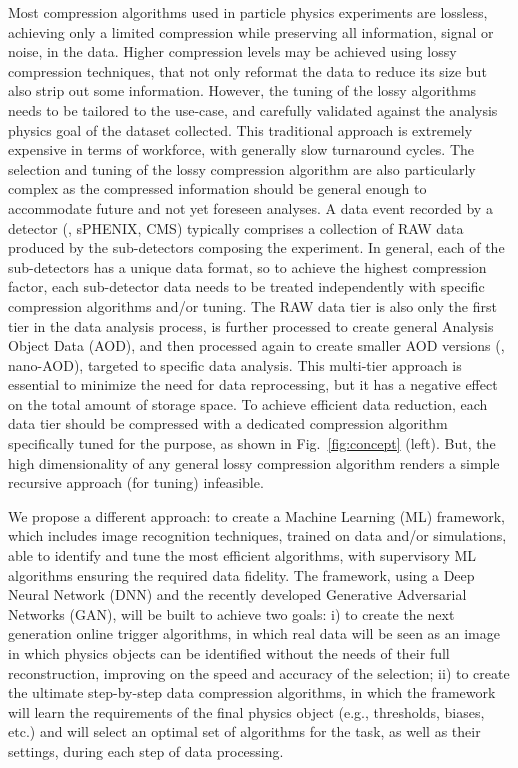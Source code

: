  Most compression algorithms used in particle physics experiments are lossless, achieving only a limited compression while preserving all information, signal or noise, in the data.  Higher compression levels may be achieved using lossy compression techniques, that not only reformat the data to reduce its size but also strip out some information. However, the tuning of the lossy algorithms needs to be tailored to the use-case, and carefully validated against the analysis physics goal of the dataset collected. This traditional approach is extremely expensive in terms of workforce, with generally slow turnaround cycles. The selection and tuning of the lossy compression algorithm are also particularly complex as the compressed information should be general enough to accommodate future and not yet foreseen analyses. A data event recorded by a detector (\eg, sPHENIX, CMS) typically comprises a collection of RAW data produced by the sub-detectors composing the experiment. In general, each of the sub-detectors has a unique data format, so to achieve the highest compression factor, each sub-detector data needs to be treated independently with specific compression algorithms and/or tuning. The RAW data tier is also only the first tier in the data analysis process, is further processed to create general Analysis Object Data (AOD), and then processed again to create smaller AOD versions (\eg, nano-AOD), targeted to specific data analysis. This multi-tier approach is essential to minimize the need for data reprocessing, but it has a negative effect on the total amount of storage space. To achieve efficient data reduction, each data tier should be compressed with a dedicated compression algorithm specifically tuned for the purpose, as shown in Fig.~\ref{fig:concept} (left). But, the high dimensionality of any general lossy compression algorithm renders a simple recursive approach (for tuning) infeasible. 

We propose a different approach: to create a Machine Learning (ML) framework, which includes image recognition techniques, trained on data and/or simulations, able to identify and tune the most efficient algorithms, with supervisory ML algorithms ensuring the required data fidelity. The framework, using a Deep Neural Network (DNN) and the recently developed Generative Adversarial Networks (GAN), will be built to achieve two goals: i) to create the next generation online trigger algorithms, in which real data will be seen as an image in which physics objects can be identified without the needs of their full reconstruction, improving on the speed and accuracy of the selection; ii) to create the ultimate step-by-step data compression algorithms, in which the framework will learn the requirements of the final physics object (e.g., thresholds, biases, etc.) and will select an optimal set of algorithms for the task, as well as their settings, during each step of data processing. 


